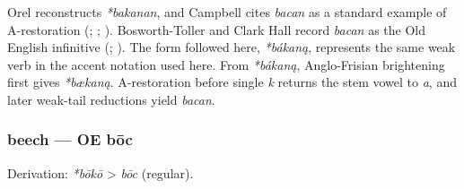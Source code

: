 \documentclass[
  british,
  a4paper,
]{article}
\begin{document}
Orel reconstructs \emph{*bakanan}, and Campbell cites \emph{bacan} as a
standard example of A-restoration (; ;
).
Bosworth-Toller and Clark Hall record \emph{bacan} as the Old English
infinitive (; ). The form
followed here, \emph{*bákaną}, represents the same weak verb in the
accent notation used here. From \emph{*bákaną}, Anglo-Frisian
brightening first gives \emph{*bækaną}. A-restoration before single
\emph{k} returns the stem vowel to \emph{a}, and later weak-tail
reductions yield \emph{bacan}.

\subsubsection{beech --- OE bōc}\label{beech-oe-bux14dc}

Derivation: \emph{*bōkō} \textgreater{} \emph{bōc} (regular).

\begingroup
\setlength{\fboxsep}{6pt}
\end{document}
